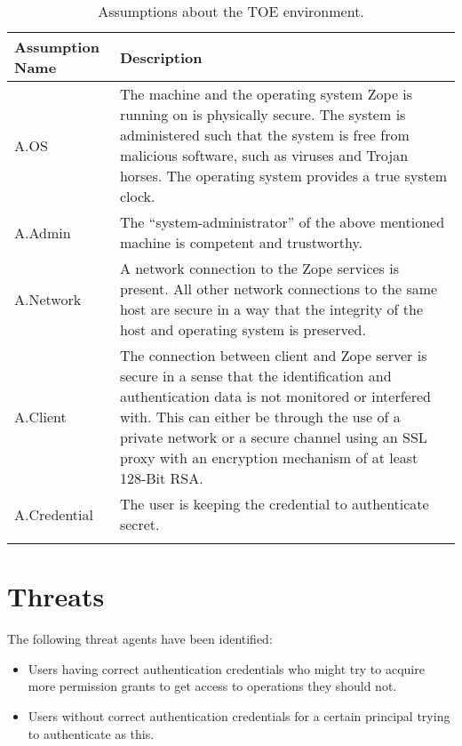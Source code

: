 \documentclass[12pt,english]{scrbook}
\begin{document}
\begin{longtable}[c]{lp{10cm}}
  \toprule
  Assumption Name & Description \\
  \midrule

  A.OS & The machine and the operating system Zope is running on is physically
  secure. The system is administered such that the system is free from
  malicious software, such as viruses and Trojan horses. The operating system
  provides a true system clock. \\

  A.Admin & 
  The ``system-administrator'' of the above
  mentioned machine is competent and trustworthy.
   \\

  A.Network & 
  A network connection to the Zope services is
  present. All other network connections to the same host are
  secure in a way that the integrity of
  the host and operating system is preserved.
   \\

  A.Client & 
  The connection between client and Zope server is
  secure in a sense that the identification and
  authentication data is not monitored or interfered with. This can either be
  through the use of a private network or a secure channel using an SSL proxy
  with an encryption mechanism of at least 128-Bit RSA.
  \\

  A.Credential & 
  The user is keeping the credential to authenticate
  secret. \\

  \bottomrule
  \caption{Assumptions about the TOE environment.}
  \label{tab-A}
\end{longtable}




\section{Threats}

The following threat agents have been identified:

\begin{itemize} 
  
  \item Users having correct authentication credentials who might try to
  acquire more permission grants to get access to operations they should not.

  \item Users without correct authentication credentials for a certain
  principal trying to authenticate as this.

\end{itemize}
\end{document}
